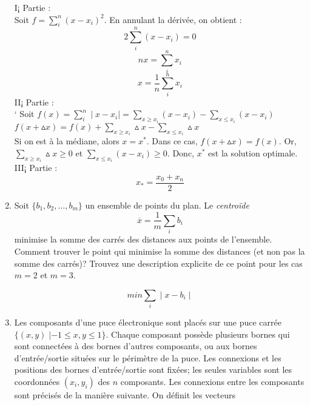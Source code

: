 \begin{enumerate}
    \begin{solution}
      I¡ Partie : \\
      \newline
      Soit $f = \sum_{i}^{n}(x-x_{i})^{2}$. En annulant la dérivée, on obtient : 
      $$ 2\sum_{i}^{n}(x-x_{i}) = 0$$
      $$ nx = \sum_{i}^{n} x_{i}$$
      $$ x = \frac{1}{n}\sum_{i}^{n} x_{i}$$
      \newline
      II¡ Partie : \\
      \newline`
      Soit $f(x) = \sum_{i}^{n}\mid x-x_{i}\mid = \sum_{x \geq x_{i}} (x-x_{i}) - \sum_{x \le x_{i}} (x-x_{i})$\\
      \newline
      $f(x + \vartriangle x) = f(x) + \sum_{x \geq x_{i}} \vartriangle x - \sum_{x \le x_{i}} \vartriangle x$ \\
      \newline
      Si on est à la médiane, alors $x = x^{*}$. Dans ce cas, $f(x + \vartriangle x) = f(x) $. Or, $\sum_{x \geq x_{i}} \vartriangle x \geq 0$ et $  \sum_{x \le x_{i}} (x-x_{i}) \geq 0$. Donc, $x^{*}$ est la solution optimale. \\
      \newline
      III¡ Partie : \\
      \newline
      $$x_{*} = \frac{x_{0} + x_{n}}{2}$$
    \end{solution}



  \item  Soit $\{b_1, b_2, \ldots, b_m\}$ un ensemble de points du plan. Le \emph{centro\"ide}
    $$\overline x = \frac{1}{m} \sum_i b_i$$
    minimise la somme des carrés des distances aux points de l'ensemble. Comment trouver le point qui minimise la somme des distances (et
    non pas la somme des carrés)? Trouvez une description explicite de ce point pour les cas $m=2$ et $m=3$.

    \begin{solution}
      $$ min \sum_{i} \mid x - b_{i} \mid $$
    \end{solution}




  \item  Les composants d'une puce électronique sont placés sur
    une puce carrée $\{ (x, y) \; |  -1 \leq x, y \leq 1\}$.
    Chaque composant possède plusieurs bornes qui sont connectées à
    des bornes d'autres composants, ou aux bornes d'entrée/\-sortie situées sur le périmètre de la puce.  Les connexions et les
    positions des bornes d'entrée/sortie sont fixées; les seules variables sont les coordonnées   $(x_i, y_i)$ des $n$
    composants.  Les connexions entre les composants
    sont précisés de la manière suivante. On définit les vecteurs



\end{enumerate}

